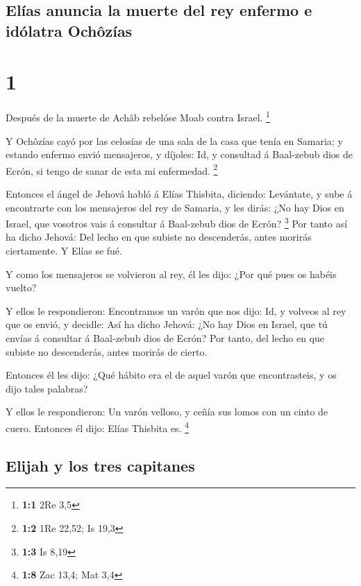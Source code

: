 \hypertarget{eluxedas-anuncia-la-muerte-del-rey-enfermo-e-iduxf3latra-ochuxf4zuxedas}{%
\subsection{Elías anuncia la muerte del rey enfermo e idólatra
Ochôzías}\label{eluxedas-anuncia-la-muerte-del-rey-enfermo-e-iduxf3latra-ochuxf4zuxedas}}

\hypertarget{section}{%
\section{1}\label{section}}

 Después de la muerte de Achâb rebelóse Moab contra Israel.
\footnote{\textbf{1:1} 2Re 3,5}

 Y Ochôzías cayó por las celosías de una sala de la casa que
tenía en Samaria; y estando enfermo envió mensajeros, y díjoles: Id, y
consultad á Baal-zebub dios de Ecrón, si tengo de sanar de esta mi
enfermedad. \footnote{\textbf{1:2} 1Re 22,52; Is 19,3}

 Entonces el ángel de Jehová habló á Elías Thisbita,
diciendo: Levántate, y sube á encontrarte con los mensajeros del rey de
Samaria, y les dirás: ¿No hay Dios en Israel, que vosotros vais á
consultar á Baal-zebub dios de Ecrón? \footnote{\textbf{1:3} Is 8,19}
 Por tanto así ha dicho Jehová: Del lecho en que subiste no
descenderás, antes morirás ciertamente. Y Elías se fué.

 Y como los mensajeros se volvieron al rey, él les dijo:
¿Por qué pues os habéis vuelto?

 Y ellos le respondieron: Encontramos un varón que nos dijo:
Id, y volveos al rey que os envió, y decidle: Así ha dicho Jehová: ¿No
hay Dios en Israel, que tú envías á consultar á Baal-zebub dios de
Ecrón? Por tanto, del lecho en que subiste no descenderás, antes morirás
de cierto.

 Entonces él les dijo: ¿Qué hábito era el de aquel varón que
encontrasteis, y os dijo tales palabras?

 Y ellos le respondieron: Un varón velloso, y ceñía sus
lomos con un cinto de cuero. Entonces él dijo: Elías Thisbita es.
\footnote{\textbf{1:8} Zac 13,4; Mat 3,4}

\hypertarget{elijah-y-los-tres-capitanes}{%
\subsection{Elijah y los tres
capitanes}\label{elijah-y-los-tres-capitanes}}

